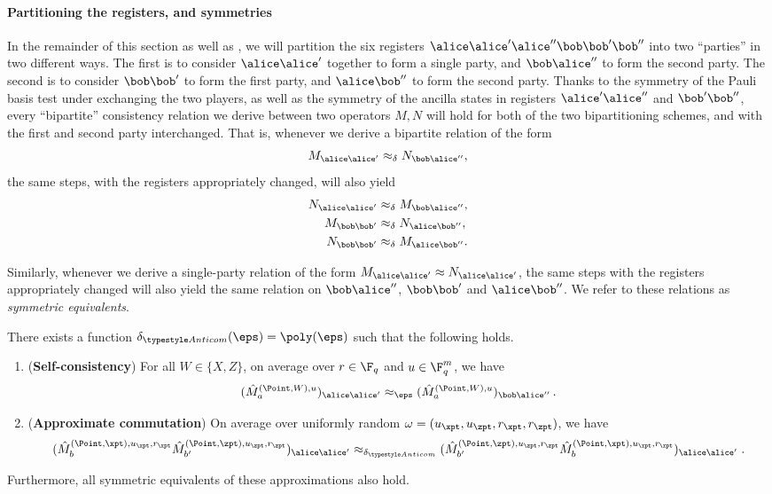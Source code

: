 \paragraph{Partitioning the registers, and symmetries}
In the remainder of this section as well as , we will partition the six registers
$\alice \alice' \alice'' \bob \bob' \bob''$ into
two ``parties'' in two different ways. The first is to consider
$\alice \alice'$ together to form  a single party, and $\bob \alice''$
to form the second party. The second is to consider $\bob \bob'$ to
form the first party, and $\alice \bob''$ to form the second
party. Thanks to the symmetry of the Pauli basis test under exchanging the
two players, as well as the symmetry of the ancilla states in
registers $\alice' \alice''$ and $\bob' \bob''$, every ``bipartite'' consistency relation we derive between two
operators $M, N$ will hold for both of the two bipartitioning schemes,
and with the first and second party interchanged. That is, whenever we
derive a bipartite relation of the form
\[ M_{\alice \alice'} \approx_\delta N_{\bob \alice''}, \]
the same steps, with the registers appropriately changed, will also
yield
\begin{align*}
  N_{\alice \alice'} &\approx_{\delta} M_{\bob \alice''}, \\
  M_{\bob \bob'} &\approx_{\delta} N_{\alice \bob''}, \\
  N_{\bob \bob'} &\approx_{\delta} M_{\alice \bob''}.
\end{align*}

Similarly, whenever we derive a single-party relation of the form
$M_{\alice \alice'} \approx N_{\alice \alice'}$, the same steps with
the registers appropriately changed will also yield the same relation
on $\bob\alice''$, $\bob \bob'$ and $\alice \bob''$. We refer to these
relations as \emph{symmetric equivalents}.

\begin{lemma}
\label{lem:qld-comm-cons}
	There exists a function $\delta_{\acom}(\eps) = \poly(\eps)$ such that the following holds. 


\begin{enumerate}
	\item (\textbf{Self-consistency}) For all $W \in \{X,Z\}$, on average over $r \in \F_q$ and $u\in \F_q^m$, we have 
	\[
		(\hat{M}^{(\Point,W),u}_a)_{\alice \alice'} \approx_\eps (\hat{M}^{(\Point,W),u}_a)_{\bob \alice''}\,.
		\]
	\item (\textbf{Approximate commutation}) On average over
          uniformly random $\omega = (u_\xpt,u_\zpt,r_\xpt,r_\zpt)$,
          we have 
	\[
		(\hat{M}^{(\Point,\xpt),u_\xpt,r_\xpt}_{b}
                \hat{M}^{(\Point,\zpt),u_\zpt,r_\zpt}_{b'})_{\alice
                  \alice'} \approx_{\delta_{\acom}}
                (\hat{M}^{(\Point,\zpt),u_\zpt,r_\zpt}_{b'}
                \hat{M}^{(\Point,\xpt),u_\xpt,r_\xpt}_{b})_{\alice
                  \alice'} \;.
	\]
      \end{enumerate}
      Furthermore, all symmetric equivalents of these approximations
      also hold.
\end{lemma}

